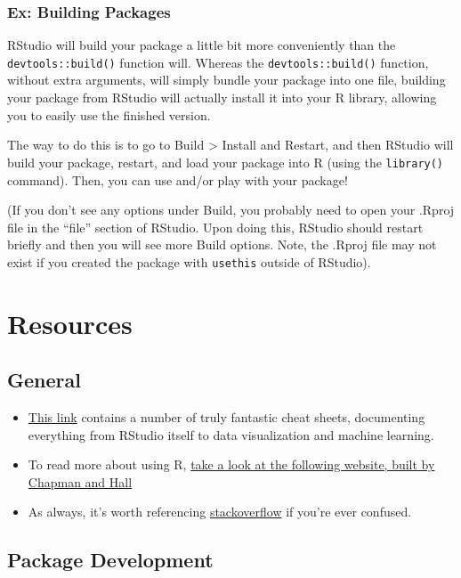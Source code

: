 \documentclass[]{book}
\providecommand{\tightlist}{%
  \setlength{\itemsep}{0pt}\setlength{\parskip}{0pt}}
\begin{document}
\subsection{Ex: Building Packages}\label{ex-building-packages}

RStudio will build your package a little bit more conveniently than the
\texttt{devtools::build()} function will. Whereas the
\texttt{devtools::build()} function, without extra arguments, will
simply bundle your package into one file, building your package from
RStudio will actually install it into your R library, allowing you to
easily use the finished version.

The way to do this is to go to Build \textgreater{} Install and Restart,
and then RStudio will build your package, restart, and load your package
into R (using the \texttt{library()} command). Then, you can use and/or
play with your package!

(If you don't see any options under Build, you probably need to open
your .Rproj file in the ``file'' section of RStudio. Upon doing this,
RStudio should restart briefly and then you will see more Build options.
Note, the .Rproj file may not exist if you created the package with
\texttt{usethis} outside of RStudio).

\chapter{Resources}\label{resources}

\section{General}\label{general}

\begin{itemize}
\tightlist
\item
  \href{https://www.rstudio.com/resources/cheatsheets/}{This link}
  contains a number of truly fantastic cheat sheets, documenting
  everything from RStudio itself to data visualization and machine
  learning.
\item
  To read more about using R, \href{http://adv-r.had.co.nz/}{take a look
  at the following website, built by Chapman and Hall}
\item
  As always, it's worth referencing
  \href{https://stackoverflow.com/questions/tagged/r/}{stackoverflow} if
  you're ever confused. 
\end{itemize}

\section{Package Development}\label{package-development-1}
\end{document}
